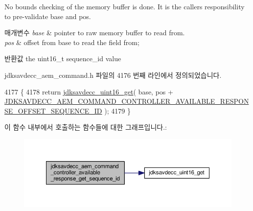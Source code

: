 No bounds checking of the memory buffer is done. It is the caller\textquotesingle{}s responsibility to pre-\/validate base and pos.


\begin{DoxyParams}{매개변수}
{\em base} & pointer to raw memory buffer to read from. \\
\hline
{\em pos} & offset from base to read the field from; \\
\hline
\end{DoxyParams}
\begin{DoxyReturn}{반환값}
the uint16\+\_\+t sequence\+\_\+id value 
\end{DoxyReturn}


jdksavdecc\+\_\+aem\+\_\+command.\+h 파일의 4176 번째 라인에서 정의되었습니다.


\begin{DoxyCode}
4177 \{
4178     \textcolor{keywordflow}{return} \hyperlink{group__endian_ga3fbbbc20be954aa61e039872965b0dc9}{jdksavdecc\_uint16\_get}( base, pos + 
      \hyperlink{group__command__controller__available__response_ga3638f496627e5e20cf80d327fea6cbfb}{JDKSAVDECC\_AEM\_COMMAND\_CONTROLLER\_AVAILABLE\_RESPONSE\_OFFSET\_SEQUENCE\_ID}
       );
4179 \}
\end{DoxyCode}


이 함수 내부에서 호출하는 함수들에 대한 그래프입니다.\+:
\nopagebreak
\begin{figure}[H]
\begin{center}
\leavevmode
\includegraphics[width=350pt]{group__command__controller__available__response_gad7f66fd1473d97fc33a40c8a2a8cedab_cgraph}
\end{center}
\end{figure}


